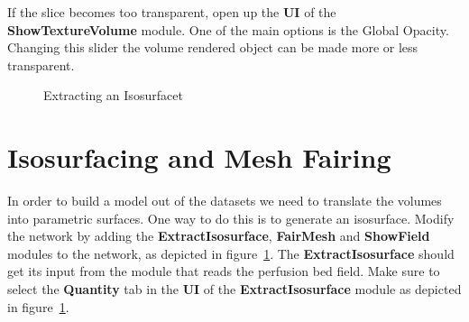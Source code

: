 \documentclass[fleqn,11pt,openany]{book}
\begin{document}
If the slice becomes too transparent, open up the {\bf UI} of the {\bf ShowTextureVolume} module. One of the main options is the Global Opacity. Changing this slider the volume rendered object can be made more or less transparent. 

\begin{figure}
\caption{Extracting an Isosurfacet}\label{fig:ExtractIsosurface}
\end{figure}

\section{Isosurfacing and Mesh Fairing}

In order to build a model out of the datasets we need to translate the volumes into parametric surfaces. One way to do this is to generate an isosurface. Modify the network by adding the {\bf ExtractIsosurface}, {\bf FairMesh} and {\bf ShowField} modules to the network, as depicted in figure~\ref{fig:ExtractIsosurface}. The {\bf ExtractIsosurface} should get its input from the module that reads the perfusion bed field. Make sure to select the {\bf Quantity} tab in the {\bf UI} of the {\bf ExtractIsosurface} module as depicted in figure~\ref{fig:ExtractIsosurface}. 
\end{document}
